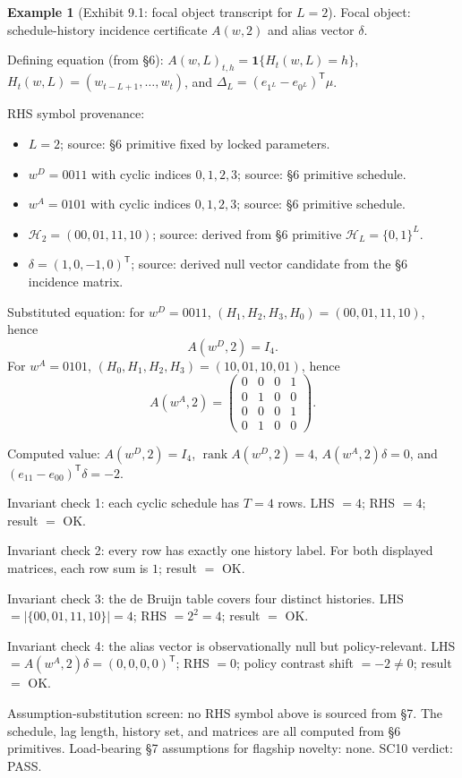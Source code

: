 \documentclass[11pt]{article}
\newcommand{\one}{\mathbf{1}}
\newcommand{\transpose}{\mathsf{T}}
\newcommand{\calH}{\mathcal{H}}
\theoremstyle{definition}
\newtheorem{example}{Example}
\theoremstyle{plain}
\theoremstyle{remark}
\begin{document}
\begin{example}[Exhibit 9.1: focal object transcript for \(L=2\)]\label{ex:l2-transcript}
Focal object: schedule-history incidence certificate \(A(w,2)\) and alias vector \(\delta\).

Defining equation (from \S6): \(A(w,L)_{t,h}=\one\{H_t(w,L)=h\}\), \(H_t(w,L)=(w_{t-L+1},\ldots,w_t)\), and \(\Delta_L=(e_{1^L}-e_{0^L})^{\transpose}\mu\).

RHS symbol provenance:
\begin{itemize}[leftmargin=2em]
\item \(L=2\); source: \S6 primitive fixed by locked parameters.
\item \(w^{D}=0011\) with cyclic indices \(0,1,2,3\); source: \S6 primitive schedule.
\item \(w^{A}=0101\) with cyclic indices \(0,1,2,3\); source: \S6 primitive schedule.
\item \(\calH_2=(00,01,11,10)\); source: derived from \S6 primitive \(\calH_L=\{0,1\}^L\).
\item \(\delta=(1,0,-1,0)^{\transpose}\); source: derived null vector candidate from the \S6 incidence matrix.
\end{itemize}

Substituted equation: for \(w^D=0011\), \((H_1,H_2,H_3,H_0)=(00,01,11,10)\), hence
\[
A(w^D,2)=I_4.
\]
For \(w^A=0101\), \((H_0,H_1,H_2,H_3)=(10,01,10,01)\), hence
\[
A(w^A,2)=
\begin{pmatrix}
0&0&0&1\\
0&1&0&0\\
0&0&0&1\\
0&1&0&0
\end{pmatrix}.
\]

Computed value: \(A(w^D,2)=I_4\), \(\operatorname{rank}A(w^D,2)=4\), \(A(w^A,2)\delta=0\), and \((e_{11}-e_{00})^{\transpose}\delta=-2\).

Invariant check 1: each cyclic schedule has \(T=4\) rows. LHS \(=4\); RHS \(=4\); result \(=\) OK.

Invariant check 2: every row has exactly one history label. For both displayed matrices, each row sum is \(1\); result \(=\) OK.

Invariant check 3: the de Bruijn table covers four distinct histories. LHS \(=|\{00,01,11,10\}|=4\); RHS \(=2^2=4\); result \(=\) OK.

Invariant check 4: the alias vector is observationally null but policy-relevant. LHS \(=A(w^A,2)\delta=(0,0,0,0)^{\transpose}\); RHS \(=0\); policy contrast shift \(=-2\ne0\); result \(=\) OK.

Assumption-substitution screen: no RHS symbol above is sourced from \S7. The schedule, lag length, history set, and matrices are all computed from \S6 primitives. Load-bearing \S7 assumptions for flagship novelty: none. SC10 verdict: PASS.
\end{example}
\end{document}
